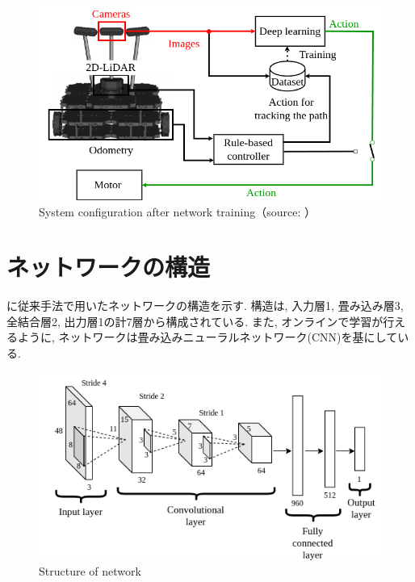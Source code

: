 \begin{figure}[h]
  \centering
  \includegraphics[keepaspectratio, scale=0.45]{images/si2021-okada-test.png}
  \caption{System configuration after network training（source: \cite{offline}）}
  \label{Fig:test}
  \end{figure}

  \newpage
\section{ネットワークの構造}
に従来手法で用いたネットワークの構造を示す. 構造は, 入力層1, 畳み込み層3, 全結合層2, 出力層1の計7層から構成されている. また, オンラインで学習が行えるように, ネットワークは畳み込みニューラルネットワーク(CNN)を基にしている. 

\vspace{10mm}
\begin{figure}[h]
  \centering
  \includegraphics[keepaspectratio, scale=0.6]{images/cnn.png}
  \caption{Structure of network}
  \label{Fig:cnn}
  \end{figure}


